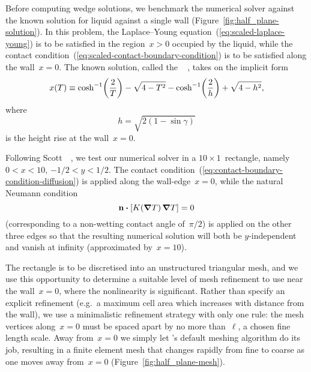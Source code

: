Before computing wedge solutions,
we benchmark the numerical solver
against the known solution
for liquid against a single wall
(Figure~\ref{fig:half_plane-solution}).
In this problem,
the Laplace--Young equation~(\ref{eq:scaled-laplace-young})
is to be satisfied in the region~$x > 0$ occupied by the liquid,
while the contact condition~(\ref{eq:scaled-contact-boundary-condition})
is to be satisfied along the wall~$x = 0$.
The known solution,
called the ~%
  \cite{anderson-2006-exact-solutions-laplace-young},
takes on the implicit form
\begin{equation}
  x (T) \ideq
    \cosh^{-1} \roundbr*{\frac{2}{T}} - \sqrt{4 - T^2}
    - \cosh^{-1} \roundbr*{\frac{2}{h}} + \sqrt{4 - h^2},
  \label{eq:half-plane-solution}
\end{equation}
where
\begin{equation}
  h = \sqrt{2 (1 - \sin\gamma)}
  \label{eq:half-plane-height}
\end{equation}
is the height rise at the wall~$x = 0$.

\begin{figure}
\end{figure}

Following Scott~\etal~\cite{scott-2005-computation-capillary-laplace-young},
we test our numerical solver in a $10 \times 1$~rectangle,
namely $0 < x < 10$, $-1/2 < y < 1/2$.
The contact condition~(\ref{eq:contact-boundary-condition-diffusion})
is applied along the wall-edge~$x = 0$,
while the natural Neumann condition
\begin{equation}
  \normalvec \dotp \squarebr[\bulkysize]{K (\del T) \del T} = 0
  \label{eq:natural-boundary-condition-diffusion}
\end{equation}
(corresponding to a non-wetting contact angle of~$\pi/2$)
is applied on the other three edges
so that the resulting numerical solution will both be $y$-independent
and vanish at infinity (approximated by~$x = 10$).

The rectangle is to be discretised into an unstructured triangular mesh,
and we use this opportunity to determine
a suitable level of mesh refinement to use
near the wall~$x = 0$, where the nonlinearity is significant.
Rather than specify an explicit refinement
(e.g.~a maximum cell area which increases with distance from the wall),
we use a minimalistic refinement strategy with only one rule:
the mesh vertices along~$x = 0$ must be spaced apart
by no more than~$\ell$, a chosen fine length scale.
Away from~$x = 0$ we simply let 's
default meshing algorithm do its job,
resulting in a finite element mesh
that changes rapidly from fine to coarse
as one moves away from~$x = 0$
(Figure~\ref{fig:half_plane-mesh}).

